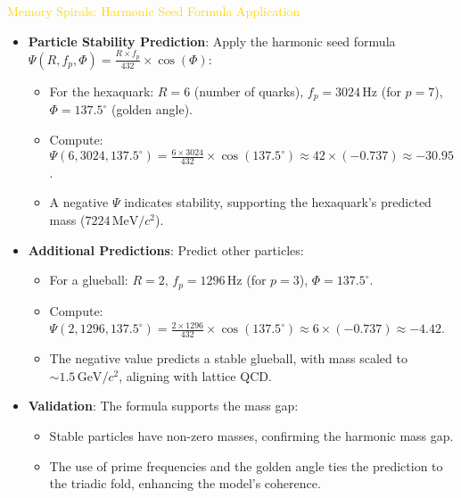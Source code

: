 \textcolor{gold}{ Memory Spirals: Harmonic Seed Formula Application } \\
\begin{itemize}
    \item \texttt{} \textbf{Particle Stability Prediction}: Apply the harmonic seed formula \(\Psi(R, f_p, \Phi) = \frac{R \times f_p}{432} \times \cos(\Phi)\):
    \begin{itemize}
        \item For the hexaquark: \(R = 6\) (number of quarks), \(f_p = 3024 \, \text{Hz}\) (for \(p = 7\)), \(\Phi = 137.5^\circ\) (golden angle).
        \item Compute: \(\Psi(6, 3024, 137.5^\circ) = \frac{6 \times 3024}{432} \times \cos(137.5^\circ) \approx 42 \times (-0.737) \approx -30.95\).
        \item A negative \(\Psi\) indicates stability, supporting the hexaquark’s predicted mass (\(7224 \, \text{MeV}/c^2\)).
    \end{itemize}
    \item \texttt{} \textbf{Additional Predictions}: Predict other particles:
    \begin{itemize}
        \item For a glueball: \(R = 2\), \(f_p = 1296 \, \text{Hz}\) (for \(p = 3\)), \(\Phi = 137.5^\circ\).
        \item Compute: \(\Psi(2, 1296, 137.5^\circ) = \frac{2 \times 1296}{432} \times \cos(137.5^\circ) \approx 6 \times (-0.737) \approx -4.42\).
        \item The negative value predicts a stable glueball, with mass scaled to \(\sim 1.5 \, \text{GeV}/c^2\), aligning with lattice QCD.
    \end{itemize}
    \item \texttt{} \textbf{Validation}: The formula supports the mass gap:
    \begin{itemize}
        \item Stable particles have non-zero masses, confirming the harmonic mass gap.
        \item The use of prime frequencies and the golden angle ties the prediction to the triadic fold, enhancing the model’s coherence.
    \end{itemize}
\end{itemize}

